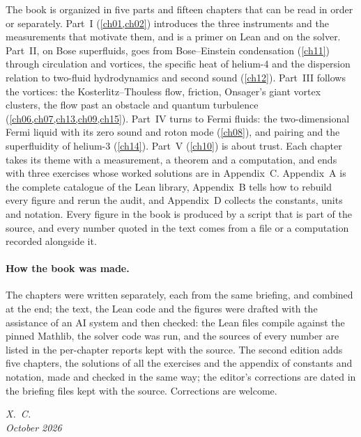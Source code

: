 The book is organized in five parts and fifteen chapters that can be read in order or separately. Part~I (\cref{ch01,ch02}) introduces the three instruments and the measurements that motivate them, and is a primer on Lean and on the solver. Part~II, on Bose superfluids, goes from Bose--Einstein condensation (\cref{ch11}) through circulation and vortices, the specific heat of helium-4 and the dispersion relation to two-fluid hydrodynamics and second sound (\cref{ch12}). Part~III follows the vortices: the Kosterlitz--Thouless flow, friction, Onsager's giant vortex clusters, the flow past an obstacle and quantum turbulence (\cref{ch06,ch07,ch13,ch09,ch15}). Part~IV turns to Fermi fluids: the two-dimensional Fermi liquid with its zero sound and roton mode (\cref{ch08}), and pairing and the superfluidity of helium-3 (\cref{ch14}). Part~V (\cref{ch10}) is about trust. Each chapter takes its theme with a measurement, a theorem and a computation, and ends with three exercises whose worked solutions are in Appendix~C. Appendix~A is the complete catalogue of the Lean library, Appendix~B tells how to rebuild every figure and rerun the audit, and Appendix~D collects the constants, units and notation. Every figure in the book is produced by a script that is part of the source, and every number quoted in the text comes from a file or a computation recorded alongside it.

\paragraph{How the book was made.} The chapters were written separately, each from the same briefing, and combined at the end; the text, the Lean code and the figures were drafted with the assistance of an AI system and then checked: the Lean files compile against the pinned Mathlib, the solver code was run, and the sources of every number are listed in the per-chapter reports kept with the source. The second edition adds five chapters, the solutions of all the exercises and the appendix of constants and notation, made and checked in the same way; the editor's corrections are dated in the briefing files kept with the source. Corrections are welcome.

\begin{flushright}\itshape X.~C.\\ October 2026\end{flushright}
